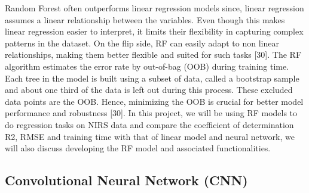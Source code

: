 \documentclass[12pt,a4paper]{article}
\begin{document}
Random Forest often outperforms linear regression models since, linear regression assumes a linear relationship between the variables. Even though this makes linear regression easier to interpret, it limits their flexibility in capturing complex patterns in the dataset. 
On the flip side, RF can easily adapt to non linear relationships, making them better flexible and suited for such tasks [30]. The RF algorithm estimates the error rate by out-of-bag (OOB) during training time. Each tree in the model is built using a subset of data, called a 
bootstrap sample and about one third of the data is left out during this process. These excluded data points are the OOB. Hence, minimizing the OOB is crucial for better model performance and robustness [30]. 
In this project, we will be using RF models to do regression tasks on NIRS data and compare the coefficient of determination R2, RMSE and training time with that of linear model and neural network, we will also discuss developing the RF model and associated functionalities. \\



\subsection{Convolutional Neural Network (CNN)}
\end{document}
